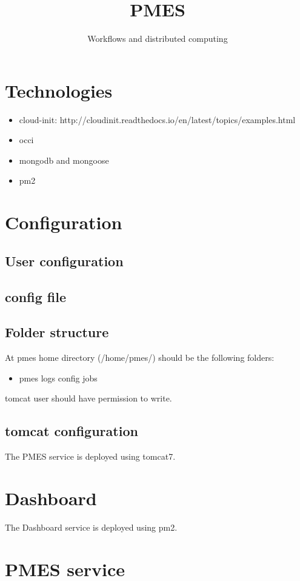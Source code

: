 \documentclass[a4paper,10pt]{article}
\title{PMES}
\author{Workflows and distributed computing}
\begin{document}
\maketitle

\section{Technologies}
\begin{itemize}
 \item cloud-init: http://cloudinit.readthedocs.io/en/latest/topics/examples.html
 \item occi
 \item mongodb and mongoose
 \item pm2
\end{itemize}

\section{Configuration}
\subsection{User configuration}
\subsection{config file}
\subsection{Folder structure}
At pmes home directory (/home/pmes/) should be the following folders:
\begin{itemize}
\item pmes
 \subitem logs
 \subitem config
 \subitem jobs
\end{itemize}

tomcat user should have permission to write.
\subsection{tomcat configuration}
The PMES service is deployed using tomcat7. 

\section{Dashboard}
The Dashboard service is deployed using pm2. 
\section{PMES service}
\end{document}
